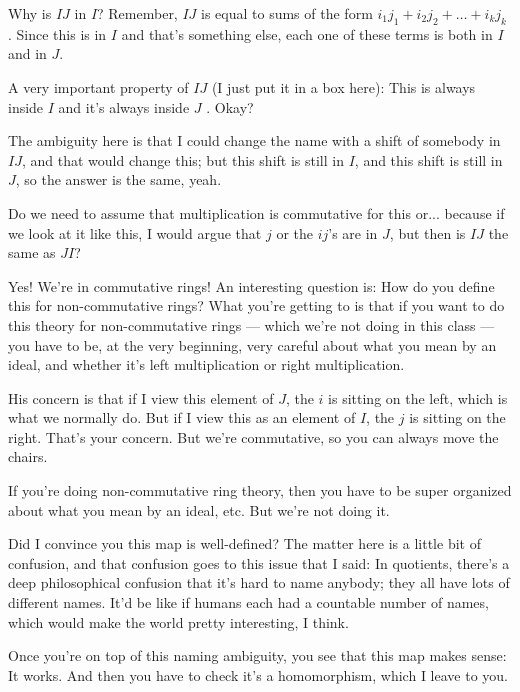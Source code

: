 \begin{speech}[01:24:09 - 01:24:55]
Why is $IJ$ in $I$? Remember, $IJ$ is equal to sums of the form $i_1 j_1 + i_2 j_2 + \dots + i_k j_k$ . Since this is in $I$ and that's something else, each one of these terms is both in $I$ and in $J$.

A very important property of $IJ$ (I just put it in a box here): This is always inside $I$ and it's always inside $J$ . Okay?

The ambiguity here is that I could change the name with a shift of somebody in $IJ$, and that would change this; but this shift is still in $I$, and this shift is still in $J$, so the answer is the same, yeah.
\end{speech}

\begin{student}
Do we need to assume that multiplication is commutative for this or... because if we look at it like this, I would argue that $j$ or the $ij$'s are in $J$, but then is $IJ$ the same as $JI$?
\end{student}

\begin{speech}[01:25:13 - 01:26:33]
Yes! We're in commutative rings! An interesting question is: How do you define this for non-commutative rings? What you're getting to is that if you want to do this theory for non-commutative rings --- which we're not doing in this class --- you have to be, at the very beginning, very careful about what you mean by an ideal, and whether it's left multiplication or right multiplication.

His concern is that if I view this element of $J$, the $i$ is sitting on the left, which is what we normally do. But if I view this as an element of $I$, the $j$ is sitting on the right. That's your concern. But we're commutative, so you can always move the chairs.

If you're doing non-commutative ring theory, then you have to be super organized about what you mean by an ideal, etc. But we're not doing it.

Did I convince you this map is well-defined? The matter here is a little bit of confusion, and that confusion goes to this issue that I said: In quotients, there's a deep philosophical confusion that it's hard to name anybody; they all have lots of different names. It'd be like if humans each had a countable number of names, which would make the world pretty interesting, I think.

Once you're on top of this naming ambiguity, you see that this map makes sense: It works. And then you have to check it's a homomorphism, which I leave to you.
\end{speech}

